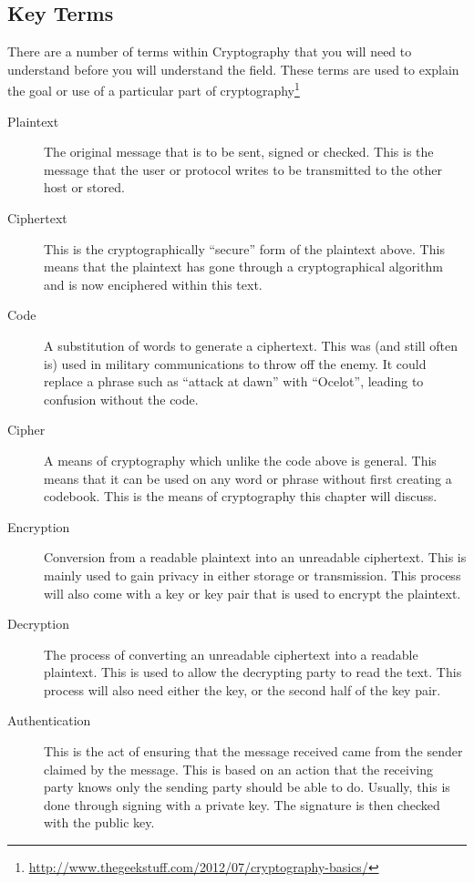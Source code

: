 		\subsection{Key Terms}
			There are a number of terms within Cryptography that you will need to understand before you will understand the field.
			These terms are used to explain the goal or use of a particular part of cryptography\footnote{\url{http://www.thegeekstuff.com/2012/07/cryptography-basics/}}
			\begin{description}
				\item[Plaintext]
					The original message that is to be sent, signed or checked.
					This is the message that the user or protocol writes to be transmitted to the other host or stored.
				\item[Ciphertext]
					This is the cryptographically ``secure'' form of the plaintext above.
					This means that the plaintext has gone through a cryptographical algorithm and is now enciphered within this text.
				\item[Code] A substitution of words to generate a ciphertext.
					This was (and still often is) used in military communications to throw off the enemy.
					It could replace a phrase such as ``attack at dawn'' with ``Ocelot'', leading to confusion without the code.
				\item[Cipher] A means of cryptography which unlike the code above is general.
					This means that it can be used on any word or phrase without first creating a codebook.
					This is the means of cryptography this chapter will discuss.
				\item[Encryption]
					Conversion from a readable plaintext into an unreadable ciphertext.
					This is mainly used to gain privacy in either storage or transmission.
					This process will also come with a key or key pair that is used to encrypt the plaintext.
				\item[Decryption]
					The process of converting an unreadable ciphertext into a readable plaintext.
					This is used to allow the decrypting party to read the text.
					This process will also need either the key, or the second half of the key pair.
				\item[Authentication]
					This is the act of ensuring that the message received came from the sender claimed by the message.
					This is based on an action that the receiving party knows only the sending party should be able to do.
					Usually, this is done through signing with a private key.
					The signature is then checked with the public key.

\end{description}
